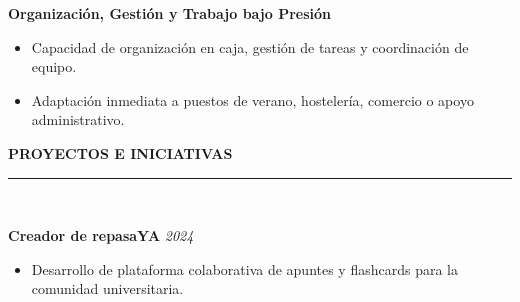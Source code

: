 \documentclass[10pt,a4paper]{article}
\begin{document}
\begin{minipage}[t]{0.64\textwidth}
{    \vspace{4pt}
    \textbf{Organización, Gestión y Trabajo bajo Presión}
    \begin{itemize}[noitemsep,topsep=2pt,leftmargin=12pt]
        \item Capacidad de organización en caja, gestión de tareas y coordinación de equipo.
        \item Adaptación inmediata a puestos de verano, hostelería, comercio o apoyo administrativo.
    \end{itemize}
    }

    \vspace{12pt}
    \textbf{\large PROYECTOS E INICIATIVAS} \\
    \rule{\linewidth}{0.6pt} \\
    {\small
    \textbf{Creador de repasaYA} \hfill \textit{2024}
    \begin{itemize}[noitemsep,topsep=2pt,leftmargin=12pt]
        \item Desarrollo de plataforma colaborativa de apuntes y flashcards para la comunidad universitaria.
    \end{itemize}
    }
\end{minipage}
\end{document}
